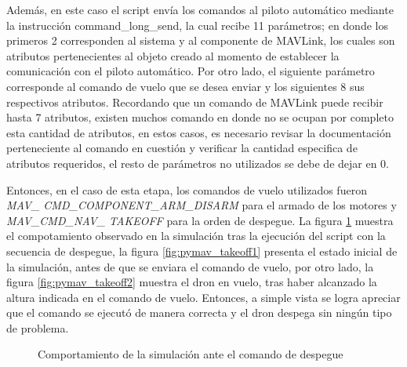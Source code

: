 Además, en este caso el script envía los comandos al piloto automático mediante la instrucción command\_long\_send, la cual recibe 11 parámetros; en donde los primeros 2 corresponden al sistema y al componente de MAVLink, los cuales son atributos pertenecientes al objeto creado al momento de establecer la comunicación con el piloto automático. Por otro lado, el siguiente parámetro corresponde al comando de vuelo que se desea enviar y los siguientes 8 sus respectivos atributos. Recordando que un comando de MAVLink puede recibir hasta 7 atributos, existen muchos comando en donde no se ocupan por completo esta cantidad de atributos, en estos casos, es necesario revisar la documentación perteneciente al comando en cuestión y verificar la cantidad especifica de atributos requeridos, el resto de parámetros no utilizados se debe de dejar en 0.

Entonces, en el caso de esta etapa, los comandos de vuelo utilizados fueron \textit{MAV\_ CMD\_COMPONENT\_ARM\_DISARM} para el armado de los motores y \textit{MAV\_CMD\_NAV\_ TAKEOFF} para la orden de despegue. La figura \ref{fig:pymav_takeoff} muestra el compotamiento observado en la simulación tras la ejecución del script con la secuencia de despegue, la figura \ref{fig:pymav_takeoff1} presenta el estado inicial de la simulación, antes de que se enviara el comando de vuelo, por otro lado, la figura \ref{fig:pymav_takeoff2} muestra el dron en vuelo, tras haber alcanzado la altura indicada en el comando de vuelo. Entonces, a simple vista se logra apreciar que el comando se ejecutó de manera correcta y el dron despega sin ningún tipo de problema.  

\begin{figure}[ht]
    \centering
    \hfill
    \caption{Comportamiento de la simulación ante el comando de despegue}
    \label{fig:pymav_takeoff}
\end{figure}


